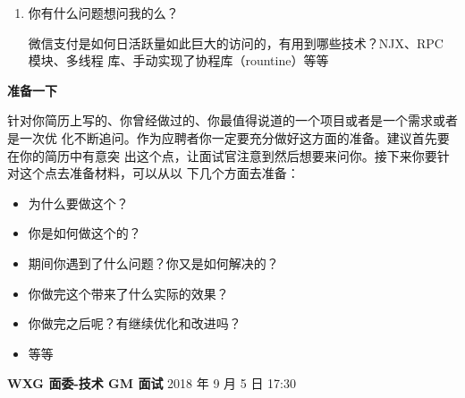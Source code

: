 \begin{enumerate}
\begin{itemize}
  \end{itemize}
  
\item 你有什么问题想问我的么？

  微信支付是如何日活跃量如此巨大的访问的，有用到哪些技术？NJX、RPC 模块、多线程
  库、手动实现了协程库（rountine）等等
  
\end{enumerate}

\noindent\textbf{准备一下}

针对你简历上写的、你曾经做过的、你最值得说道的一个项目或者是一个需求或者是一次优
化不断追问。作为应聘者你一定要充分做好这方面的准备。建议首先要在你的简历中有意突
出这个点，让面试官注意到然后想要来问你。接下来你要针对这个点去准备材料，可以从以
下几个方面去准备：

\begin{itemize}
\item 为什么要做这个？
\item 你是如何做这个的？
\item 期间你遇到了什么问题？你又是如何解决的？
\item 你做完这个带来了什么实际的效果？
\item 你做完之后呢？有继续优化和改进吗？
\item 等等
\end{itemize}

\noindent\textbf{WXG 面委-技术 GM 面试} 2018 年 9 月 5 日 17:30



\endinput





